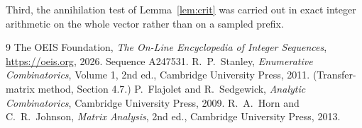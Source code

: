 \documentclass[11pt,a4paper]{article}
\theoremstyle{plain}
\theoremstyle{definition}
\begin{document}
Third, the annihilation test of Lemma~\ref{lem:crit} was carried out in exact integer
arithmetic on the whole vector rather than on a sampled prefix.

\begin{thebibliography}{9}
 The OEIS Foundation, \emph{The On-Line Encyclopedia of Integer
Sequences}, \url{https://oeis.org}, 2026. Sequence A247531.
 R.~P.~Stanley, \emph{Enumerative Combinatorics}, Volume 1, 2nd ed.,
Cambridge University Press, 2011. (Transfer-matrix method, Section 4.7.)
 P.~Flajolet and R.~Sedgewick, \emph{Analytic Combinatorics}, Cambridge
University Press, 2009.
 R.~A.~Horn and C.~R.~Johnson, \emph{Matrix Analysis}, 2nd ed., Cambridge
University Press, 2013.
\end{thebibliography}
\end{document}
